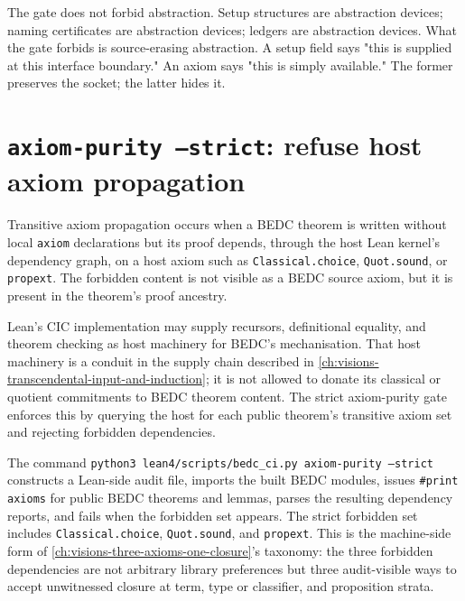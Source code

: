 \begin{remark}
\label{rem:audit-gates-not-anti-abstraction}
The gate does not forbid abstraction. Setup structures are abstraction devices; naming certificates are abstraction devices; ledgers are abstraction devices. What the gate forbids is source-erasing abstraction. A setup field says "this is supplied at this interface boundary." An axiom says "this is simply available." The former preserves the socket; the latter hides it.
\end{remark}

\section{\texttt{axiom-purity --strict}: refuse host axiom propagation}
\label{sec:audit-gates-axiom-purity}

\begin{definition}
\label{def:audit-gates-transitive-axiom-propagation}
Transitive axiom propagation occurs when a BEDC theorem is written without local \texttt{axiom} declarations but its proof depends, through the host Lean kernel's dependency graph, on a host axiom such as \texttt{Classical.choice}, \texttt{Quot.sound}, or \texttt{propext}. The forbidden content is not visible as a BEDC source axiom, but it is present in the theorem's proof ancestry.
\end{definition}

\begin{principle}
\label{prin:audit-gates-host-conduit}
Lean's CIC implementation may supply recursors, definitional equality, and theorem checking as host machinery for BEDC's mechanisation. That host machinery is a conduit in the supply chain described in \autoref{ch:visions-transcendental-input-and-induction}; it is not allowed to donate its classical or quotient commitments to BEDC theorem content. The strict axiom-purity gate enforces this by querying the host for each public theorem's transitive axiom set and rejecting forbidden dependencies.
\end{principle}

The command \texttt{python3 lean4/scripts/bedc\_ci.py axiom-purity --strict} constructs a Lean-side audit file, imports the built BEDC modules, issues \texttt{\#print axioms} for public BEDC theorems and lemmas, parses the resulting dependency reports, and fails when the forbidden set appears. The strict forbidden set includes \texttt{Classical.choice}, \texttt{Quot.sound}, and \texttt{propext}. This is the machine-side form of \autoref{ch:visions-three-axioms-one-closure}'s taxonomy: the three forbidden dependencies are not arbitrary library preferences but three audit-visible ways to accept unwitnessed closure at term, type or classifier, and proposition strata.

